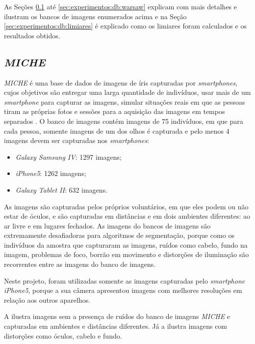 \par As Seções \ref{sec:experimentos:db:miche} até \ref{sec:experimentos:db:warsaw} explicam com mais detalhes e ilustram os bancos de imagens enumerados acima e na Seção \ref{sec:experimentos:db:limiares} é explicado como os limiares foram calculados e os resultados obtidos.

\subsection{\textit{MICHE}}\label{sec:experimentos:db:miche}

\par \textit{MICHE} é uma base de dados de imagens de íris capturadas por \textit{smartphones}, cujos objetivos são entregar uma larga quantidade de indivíduos, usar mais de um \textit{smartphone} para capturar as imagens, simular situações reais em que as pessoas tiram as próprias fotos e sessões para a aquisição das imagens em tempos separados \cite{santada2016-MICHE-2}. O banco de imagens contém imagens de 75 indivíduos, em que para cada pessoa, somente imagens de um dos olhos é capturada e pelo menos 4 imagens devem ser capturadas nos \textit{smartphones}:

\begin{itemize}
    \item \textit{Galaxy Samsung IV}: 1297 imagens;
    \item \textit{iPhone5}: 1262 imagens;
    \item \textit{Galaxy Tablet II}: 632 imagens.
\end{itemize}

\par As imagens são capturadas pelos próprios voluntários, em que eles podem ou não estar de óculos, e são capturadas em distâncias e em dois ambientes diferentes: ao ar livre e em lugares fechados. As imagens do bancos de imagens são extremamente desafiadoras para algoritmos de segmentação, porque como os indivíduos da amostra que capturaram as imagens, ruídos como cabelo, fundo na imagem, problemas de foco, borrão em movimento e distorções de iluminação são recorrentes entre as imagens do banco de imagens.

\par Neste projeto, foram utilizadas somente as imagens capturadas pelo \textit{smartphone} \textit{iPhone5}, porque a sua câmera apresentou imagens com melhores resoluções em relação aos outros aparelhos.

\par A  ilustra imagens sem a presença de ruídos do banco de imagens \textit{MICHE} e capturadas em ambientes e distâncias diferentes. Já a  ilustra imagens com distorções como óculos, cabelo e fundo.

